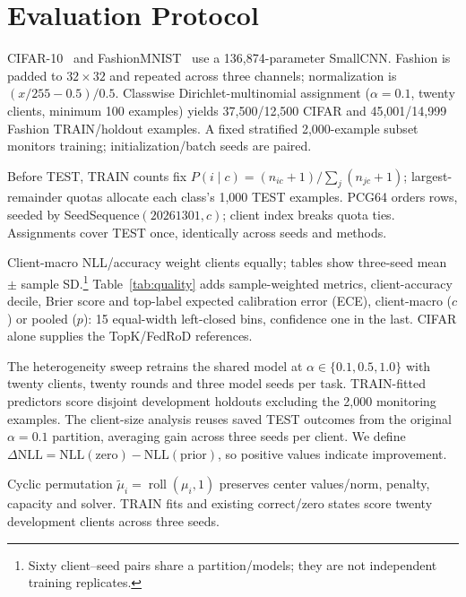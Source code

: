\section{Evaluation Protocol}
CIFAR-10~\cite{krizhevsky2009tiny} and FashionMNIST~\cite{xiao2017fashion} use a 136,874-parameter SmallCNN. Fashion is padded to $32\times32$ and repeated across three channels; normalization is $(x/255-0.5)/0.5$. Classwise Dirichlet-multinomial assignment ($\alpha=0.1$, twenty clients, minimum 100 examples) yields 37,500/12,500 CIFAR and 45,001/14,999 Fashion TRAIN/holdout examples. A fixed stratified 2,000-example subset monitors training; initialization/batch seeds are paired.

Before TEST, TRAIN counts fix $P(i\mid c)=(n_{ic}+1)/\sum_j(n_{jc}+1)$; largest-remainder quotas allocate each class's 1,000 TEST examples. PCG64 orders rows, seeded by SeedSequence$(20261301,c)$; client index breaks quota ties. Assignments cover TEST once, identically across seeds and methods.

Client-macro NLL/accuracy weight clients equally; tables show three-seed mean $\pm$ sample SD.\footnote{Sixty client--seed pairs share a partition/models; they are not independent training replicates.} Table~\ref{tab:quality} adds sample-weighted metrics, client-accuracy decile, Brier score and top-label expected calibration error (ECE), client-macro ($c$) or pooled ($p$): 15 equal-width left-closed bins, confidence one in the last. CIFAR alone supplies the TopK/FedRoD references.

The heterogeneity sweep retrains the shared model at $\alpha\in\{0.1,0.5,1.0\}$ with twenty clients, twenty rounds and three model seeds per task. TRAIN-fitted predictors score disjoint development holdouts excluding the 2,000 monitoring examples. The client-size analysis reuses saved TEST outcomes from the original $\alpha=0.1$ partition, averaging gain across three seeds per client. We define $\Delta\mathrm{NLL}=\mathrm{NLL}(\mathrm{zero})-\mathrm{NLL}(\mathrm{prior})$, so positive values indicate improvement.

Cyclic permutation $\widetilde\mu_i=\operatorname{roll}(\mu_i,1)$ preserves center values/norm, penalty, capacity and solver. TRAIN fits and existing correct/zero states score twenty development clients across three seeds.
